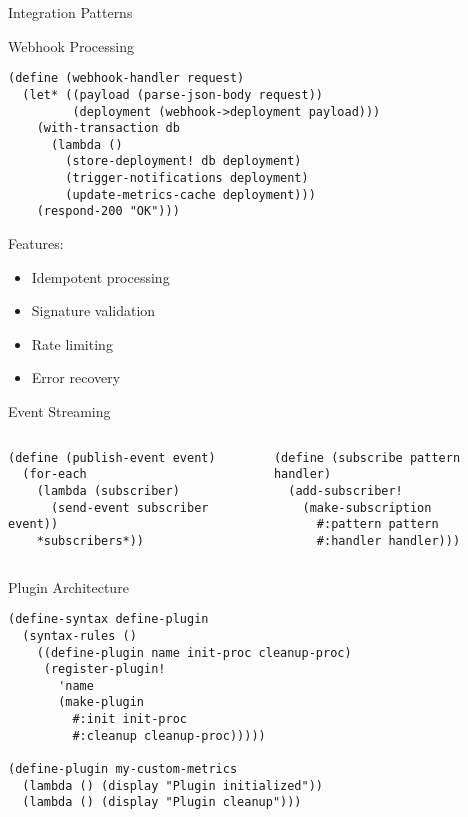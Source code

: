 \documentclass[presentation,aspectratio=169]{beamer}
\begin{document}
\begin{frame}[label={sec:org28df934},fragile]{Integration Patterns}
 \begin{block}{Webhook Processing}
\begin{verbatim}
(define (webhook-handler request)
  (let* ((payload (parse-json-body request))
         (deployment (webhook->deployment payload)))
    (with-transaction db
      (lambda ()
        (store-deployment! db deployment)
        (trigger-notifications deployment)
        (update-metrics-cache deployment)))
    (respond-200 "OK")))
\end{verbatim}

Features:
\begin{itemize}
\item Idempotent processing
\item Signature validation
\item Rate limiting
\item Error recovery
\end{itemize}
\end{block}
\begin{block}{Event Streaming}
\begin{columns}
\begin{column}{0.5\columnwidth}
\begin{verbatim}
(define (publish-event event)
  (for-each
    (lambda (subscriber)
      (send-event subscriber event))
    *subscribers*))
\end{verbatim}
\end{column}
\begin{column}{0.5\columnwidth}
\begin{verbatim}
(define (subscribe pattern handler)
  (add-subscriber!
    (make-subscription
      #:pattern pattern
      #:handler handler)))
\end{verbatim}
\end{column}
\end{columns}
\end{block}
\begin{block}{Plugin Architecture}
\begin{verbatim}
(define-syntax define-plugin
  (syntax-rules ()
    ((define-plugin name init-proc cleanup-proc)
     (register-plugin!
       'name
       (make-plugin
         #:init init-proc
         #:cleanup cleanup-proc)))))

(define-plugin my-custom-metrics
  (lambda () (display "Plugin initialized"))
  (lambda () (display "Plugin cleanup")))
\end{verbatim}
\end{block}
\end{frame}
\end{document}
